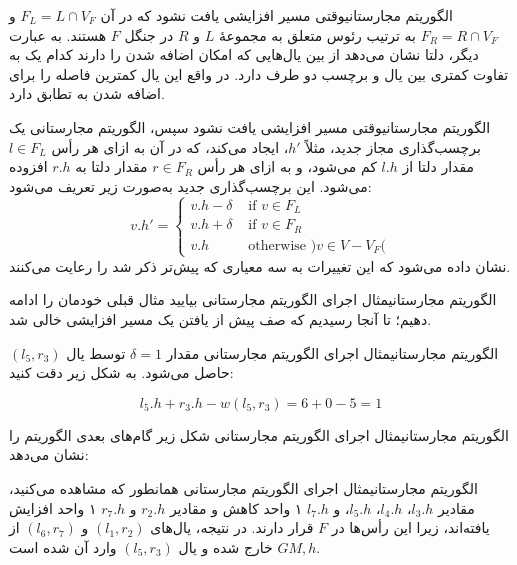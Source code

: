 \begin{itemframe-s}{الگوریتم مجارستانی}{وقتی مسیر افزایشی یافت نشود}
\itm
که در آن
$F_L = L \cap V_F$ و
$F_R = R \cap V_F$
به ترتیب رئوس متعلق به مجموعهٔ $L$ و $R$ در جنگل $F$ هستند.
\itm
به عبارت دیگر،
دلتا نشان می‌دهد از بین یال‌هایی که امکان اضافه شدن را دارند کدام یک به تفاوت کمتری بین یال و برچسب دو طرف دارد. در واقع این یال کمترین فاصله را برای اضافه شدن به تطابق دارد.


\end{itemframe-s}


\begin{itemframe-s}{الگوریتم مجارستانی}{وقتی مسیر افزایشی یافت نشود}
\itm
سپس، الگوریتم مجارستانی یک برچسب‌گذاری مجاز جدید، مثلاً
$h'$،
ایجاد می‌کند، که در آن به ازای هر رأس
$l \in F_L$
مقدار دلتا از
$l.h$
کم می‌شود، و به ازای هر رأس
$r \in F_R$
مقدار دلتا
به
$r.h$
افزوده می‌شود. این برچسب‌گذاری جدید به‌صورت زیر تعریف می‌شود:
$$
v.h' =
\begin{cases}
v.h - \delta & \text{ if } v \in F_L \\
v.h + \delta & \text{ if } v \in F_R \\
v.h & \text{ otherwise } \text{)} v \in V - V_F \text{(}
\end{cases}
$$
\itm
نشان داده می‌شود که این تغییرات به سه معیاری که پیش‌تر ذکر شد را رعایت می‌کنند.
\end{itemframe-s}


\begin{itemframe-s}{الگوریتم مجارستانی}{مثال اجرای الگوریتم مجارستانی}
\itm
بیایید مثال قبلی خودمان را ادامه دهیم؛
تا آنجا رسیدیم که صف پیش از یافتن یک مسیر افزایشی خالی شد.
\end{itemframe-s}


\begin{itemframe-s}{الگوریتم مجارستانی}{مثال اجرای الگوریتم مجارستانی}
\itm
مقدار
$\delta = 1$
توسط یال
$(l_5, r_3)$
حاصل می‌شود. به شکل زیر دقت کنید:


$$
 l_5.h + r_3.h - w(l_5, r_3) = 6 + 0 - 5 = 1
$$
\end{itemframe-s}


\begin{itemframe-s}{الگوریتم مجارستانی}{مثال اجرای الگوریتم مجارستانی}
\itm
شکل زیر گام‌های بعدی الگوریتم را نشان می‌دهد:
\end{itemframe-s}


\begin{itemframe-s}{الگوریتم مجارستانی}{مثال اجرای الگوریتم مجارستانی}
\itm
همانطور که مشاهده می‌کنید، مقادیر
$l_3.h$،
$l_4.h$،
$l_5.h$، و
$l_7.h$
۱ واحد کاهش و مقادیر
$r_2.h$ و
$r_7.h$
۱ واحد افزایش یافته‌اند، زیرا این رأس‌ها در $F$ قرار دارند.
\itm
در نتیجه، یال‌های
$(l_1, r_2)$ و
$(l_6, r_7)$
 از $G{M, h}$ خارج شده و یال
$(l_5, r_3)$
وارد آن شده است.
\end{itemframe-s}



